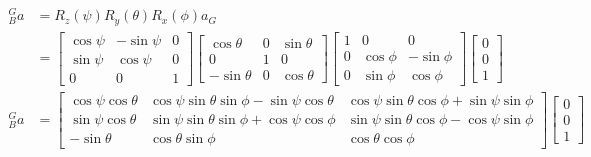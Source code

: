 \begin{align*}
    {}^G_B a &= R_z(\psi) R_y(\theta) R_x(\phi) a_G \\
    &= 
    \left[
        \begin{matrix}
            \cos\psi & -\sin\psi & 0 \\
            \sin\psi & \cos\psi & 0 \\
            0 & 0 & 1
        \end{matrix}
    \right]
    \left[
        \begin{matrix}
            \cos\theta & 0 & \sin\theta \\
            0 & 1 & 0 \\
            -\sin\theta & 0 & \cos\theta
        \end{matrix}
    \right]
    \left[
        \begin{matrix}
            1 & 0 & 0 \\
            0 & \cos\phi & -\sin\phi \\
            0 & \sin\phi & \cos\phi 
        \end{matrix}
    \right] 
    \left[
        \begin{matrix}
            0 \\
            0 \\
            1
        \end{matrix}
    \right]\\
    {}^G_B a &= 
    \left[
        \begin{matrix}
            \cos\psi\cos\theta & \cos\psi\sin\theta\sin\phi-\sin\psi\cos\theta & \cos\psi\sin\theta\cos\phi+\sin\psi\sin\phi \\
            \sin\psi\cos\theta & \sin\psi\sin\theta\sin\phi+\cos\psi\cos\phi & \sin\psi\sin\theta\cos\phi-\cos\psi\sin\phi \\
            -\sin\theta & \cos\theta\sin\phi & \cos\theta\cos\phi
        \end{matrix}
    \right]
    \left[
        \begin{matrix}
            0 \\
            0 \\
            1
        \end{matrix}
    \right]
\end{align*}
